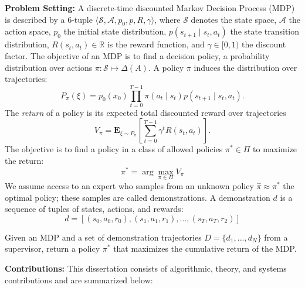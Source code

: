 \vspace{0.75em} \noindent \textbf{Problem Setting: }
A discrete-time discounted Markov Decision Process (MDP) is described by a 6-tuple $\langle \mathcal{S}, \mathcal{A}, p_0, p, R, \gamma \rangle$, where $\mathcal{S}$ denotes the state space, $\mathcal{A}$ the action space, $p_0$ the initial state distribution, $p(s_{t+1} \mid s_{t}, a_{t})$ the state transition distribution, $R(s_t, a_t) \in \mathbb{R}$ is the reward function, and $\gamma \in [0,1)$ the discount factor. 
The objective of an MDP is to find a decision policy, a probability distribution over actions $\pi: \mathcal{S} \mapsto \Delta(A)$.
A policy $\pi$ induces the distribution over trajectories:
\[
P_\pi(\xi) = p_0(x_0) \prod_{t=0}^{T-1} \pi(a_t \mid s_t) p(s_{t+1} \mid s_{t}, a_{t}).
\]
The \emph{return} of a policy is its expected total discounted reward over trajectories
\[
V_\pi = \mathbf{E}_{\xi \sim P_\pi}\left[\sum_{t=0}^{T-1} \gamma^t R(s_t,a_t)\right].
\]
The objective is to find a policy in a class of allowed policies $\pi^* \in \Pi$ to maximize the return:
\begin{equation}
\pi^* = \arg \max_{\pi \in \Pi} V_\pi 
\label{eq:main}
\end{equation}
We assume access to an expert who samples from an unknown policy $\hat{\pi} \approx \pi^*$ the optimal policy; these samples are called demonstrations. A demonstration $d$ is a sequence of tuples of states, actions, and rewards:
\[d = [(s_0,a_0,r_0),(s_1,a_1,r_1),...,(s_T,a_T,r_2)]\]

\vspace{0.25em}

\begin{problem}
Given an MDP and a set of demonstration trajectories $D = \{d_1,...,d_N\}$ from a supervisor, return a policy $\pi^*$ that maximizes the cumulative return of the MDP.
\end{problem}


\vspace{0.75em} \noindent \textbf{Contributions: }  This dissertation consists of algorithmic, theory, and systems contributions and are summarized below:


